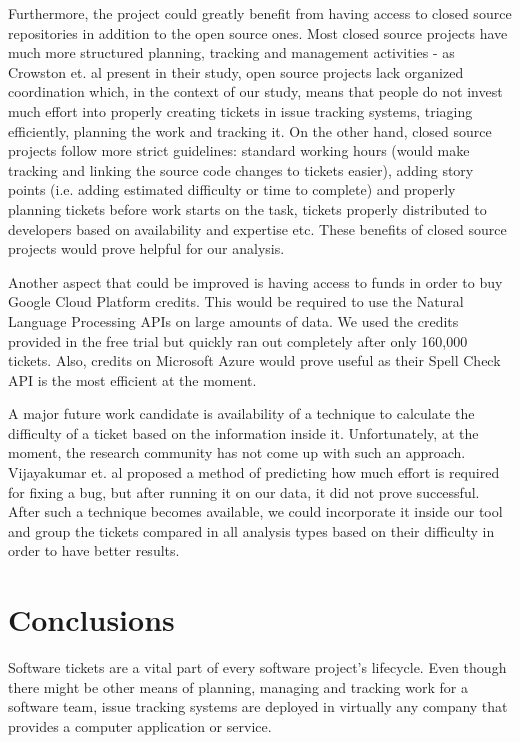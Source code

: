 \documentclass{mpaper}
\begin{document}
Furthermore, the project could greatly benefit from having access to closed source repositories in addition to the 
open source ones. Most closed source projects have much more structured planning, tracking and management activities - as 
Crowston et. al \cite{crowston2012free} present in their study, open source projects lack organized coordination which,
in the context of our study, means that people do not invest much effort into properly creating tickets in issue tracking 
systems, triaging efficiently, planning the work and tracking it. On the other hand, closed source projects follow 
more strict guidelines: standard working hours (would make tracking and linking the source code changes to tickets easier), 
adding story points (i.e. adding estimated difficulty or time to complete) and properly planning tickets before work 
starts on the task, tickets properly distributed to developers based on availability and expertise etc. These benefits 
of closed source projects would prove helpful for our analysis.

Another aspect that could be improved is having access to funds in order to buy Google Cloud Platform credits. This 
would be required to use the Natural Language Processing APIs on large amounts of data. We used the credits provided 
in the free trial but quickly ran out completely after only 160,000 tickets. Also, credits on Microsoft Azure would 
prove useful as their Spell Check API is the most efficient at the moment.

A major future work candidate is availability of a technique to calculate the difficulty of a ticket based on the information
inside it. Unfortunately, at the moment, the research community has not come up with such an approach. 
Vijayakumar et. al \cite{vijayakumar2014much} proposed a method of predicting how much effort is required for fixing 
a bug, but after running it on our data, it did not prove successful. After such a technique becomes available, we could 
incorporate it inside our tool and group the tickets compared in all analysis types based on their difficulty in order to 
have better results.

\section{Conclusions}\label{conclusions}

Software tickets are a vital part of every software project's lifecycle. Even though there might be other means
of planning, managing and tracking work for a software team, issue tracking systems are deployed in virtually any company
that provides a computer application or service.
\end{document}

